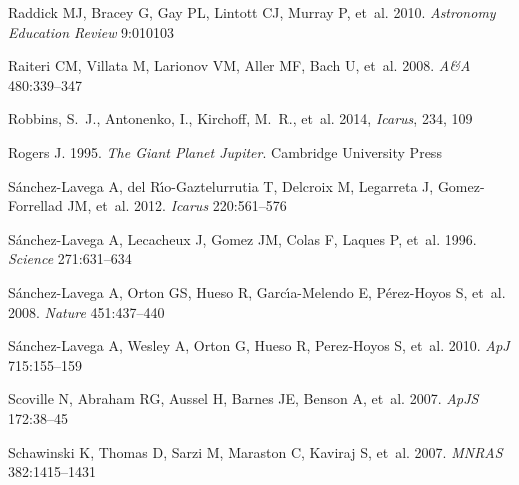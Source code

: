 \documentclass{ar2e}
\def\apjs{ApJS}
\def\aap{A{\&}A}
\def\mnras{MNRAS}
\begin{document}
\begin{thebibliography}{}
{Raddick} MJ, {Bracey} G, {Gay} PL, {Lintott} CJ, {Murray} P, et~al. 2010.
\newblock \textit{Astronomy Education Review} 9:010103

{Raiteri} CM, {Villata} M, {Larionov} VM, {Aller} MF, {Bach} U, et~al. 2008.
\newblock \textit{\aap} 480:339--347

{Robbins}, S.~J., {Antonenko}, I., {Kirchoff}, M.~R., {et~al.} 2014, 
\newblock \textit{Icarus}, 234, 109

Rogers J. 1995.
\newblock \textit{{The Giant Planet Jupiter}}.
\newblock Cambridge University Press

{S{\'a}nchez-Lavega} A, {del R{\'{\i}}o-Gaztelurrutia} T, {Delcroix} M,
  {Legarreta} J, {Gomez-Forrellad} JM, et~al. 2012.
\newblock \textit{Icarus} 220:561--576

{S{\'a}nchez-Lavega} A, {Lecacheux} J, {Gomez} JM, {Colas} F, {Laques} P,
  et~al. 1996.
\newblock \textit{Science} 271:631--634

{S{\'a}nchez-Lavega} A, {Orton} GS, {Hueso} R, {Garc{\'{\i}}a-Melendo} E,
  {P{\'e}rez-Hoyos} S, et~al. 2008.
\newblock \textit{Nature} 451:437--440

S{\'a}nchez-Lavega A, Wesley A, Orton G, Hueso R, Perez-Hoyos S, et~al. 2010.
\newblock \textit{ApJ} 715:155--159

{Scoville} N, {Abraham} RG, {Aussel} H, {Barnes} JE, {Benson} A, et~al. 2007.
\newblock \textit{\apjs} 172:38--45

{Schawinski} K, {Thomas} D, {Sarzi} M, {Maraston} C, {Kaviraj} S, et~al. 2007.
\newblock \textit{\mnras} 382:1415--1431


\end{thebibliography}
\end{document}

